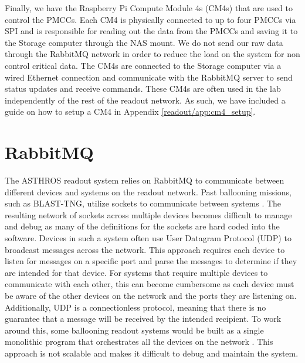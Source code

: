 Finally, we have the Raspberry Pi Compute Module 4s (CM4s) that are used to control the PMCCs. 
Each CM4 is physically connected to up to four PMCCs via SPI and is responsible for reading out the data from the PMCCs and saving it to the Storage computer through the NAS mount.
We do not send our raw data through the RabbitMQ network in order to reduce the load on the system for non control critical data. 
The CM4s are connected to the Storage computer via a wired Ethernet connection and communicate with the RabbitMQ server to send status updates and receive commands.
These CM4s are often used in the lab independently of the rest of the readout network.
As such, we have included a guide on how to setup a CM4 in Appendix \ref{readout/app:cm4_setup}.

\section{RabbitMQ}
\label{readout/section:rmqtools}
The ASTHROS readout system relies on RabbitMQ to communicate between different devices and systems on the readout network.
Past ballooning missions, such as BLAST-TNG, utilize sockets to communicate between systems \parencite{gordon2019highly}.
The resulting network of sockets across multiple devices becomes difficult to manage and debug as many of the definitions for the sockets are hard coded into the software.
Devices in such a system often use User Datagram Protocol (UDP) to broadcast messages across the network.
This approach requires each device to listen for messages on a specific port and parse the messages to determine if they are intended for that device.
For systems that require multiple devices to communicate with each other, this can become cumbersome as each device must be aware of the other devices on the network and the ports they are listening on.
Additionally, UDP is a connectionless protocol, meaning that there is no guarantee that a message will be received by the intended recipient.
To work around this, some ballooning readout systems would be built as a single monolithic program that orchestrates all the devices on the network \parencite{gordon2019highly}.
This approach is not scalable and makes it difficult to debug and maintain the system.

